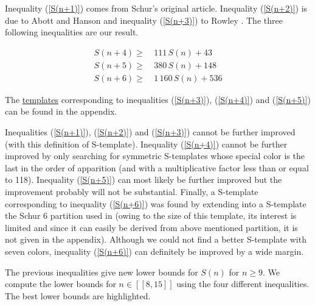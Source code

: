 Inequality (\ref{S(n+1)}) comes from  Schur's original article\cite{Schur1917}. Inequality (\ref{S(n+2)}) is due to
Abott and Hanson \cite{AbbottHanson} and inequality (\ref{S(n+3)}) to Rowley \cite{RowleyRamsey}. 
The three following inequalities are our result.

\begin{align}
	S(n + 4) \geqslant &~111\,S(n) + 43 \label{S(n+4)}\\
	S(n + 5) \geqslant &~380\,S(n) + 148 \label{S(n+5)}\\
	S(n + 6) \geqslant &~1\,160\,S(n) + 536 \label{S(n+6)}
\end{align}

\par The \hyperref[S-templates]{templates} corresponding to inequalities (\ref{S(n+3)}), (\ref{S(n+4)}) and 
(\ref{S(n+5)}) can be found in the appendix.

\par
Inequalities (\ref{S(n+1)}), (\ref{S(n+2)}) and (\ref{S(n+3)}) cannot be further improved (with this definition of S-template). 
Inequality (\ref{S(n+4)}) cannot be further improved by only searching for symmetric S-templates whose special color is the 
last in the order of apparition (and with a multiplicative factor less than or equal to 118). Inequality (\ref{S(n+5)}) can most 
likely be further improved but the improvement probably will not be substantial. Finally, a S-template corresponding to inequality 
(\ref{S(n+6)}) was found by extending into a S-template the Schur 6 partition used in \cite{rowley2021improved} (owing to the 
size of this template, its interest is limited and since it can easily be derived from above mentioned partition, it is not given in 
the appendix). Although we could not find a better S-template with seven colors, inequality (\ref{S(n+6)}) can definitely be 
improved by a wide margin.

\par
The previous inequalities give new lower bounds for \(S(n)\) for
\( n \geqslant 9 \). We compute the lower
bounds for \( n \in [\![8,15]\!] \) using the four different inequalities. The best lower bounds are highlighted.

\renewcommand{\arraystretch}{0.2}

